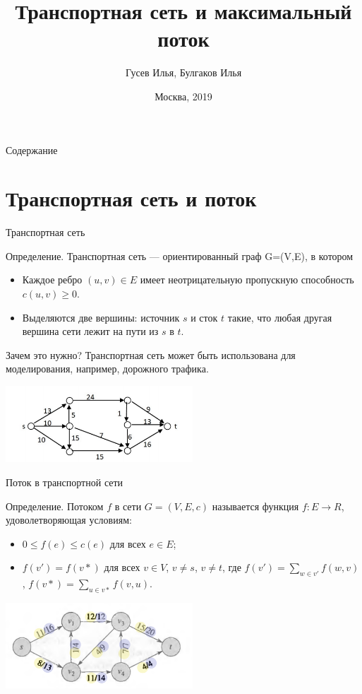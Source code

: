 \documentclass[10pt]{beamer}
\title[\href{https://goo.gl/NRgp8K}{https://goo.gl/NRgp8K} (Term 1)]{Транспортная сеть и максимальный поток}
\author[Гусев Илья, Булгаков Илья]{Гусев Илья, Булгаков Илья}
\institute[МФТИ] 
{Московский физико-технический институт\\*}
\date{Москва, 2019}
\begin{document}
\begin{frame}
  \titlepage
\end{frame}

\begin{frame}{Содержание}
\tableofcontents
\end{frame}

\section{Транспортная сеть и поток}

\begin{frame}[fragile]{Транспортная сеть}

Определение. Транспортная сеть — ориентированный граф G=(V,E), в котором
\begin{itemize}
    \item Каждое ребро $(u,v) \in E$ имеет неотрицательную пропускную способность $c(u,v)\geq 0$. 
    \item Выделяются две вершины: источник $s$ и сток $t$ такие, что любая другая вершина сети лежит на пути из $s$ в $t$.
\end{itemize}
Зачем это нужно? Транспортная сеть может быть использована для моделирования, например, дорожного трафика.

\begin{center}
    \includegraphics[width=7cm]{Term_2/Source/images/8-transport-network.jpg}
\end{center}

\end{frame}

\begin{frame}[fragile]{Поток в транспортной сети}

Определение. Потоком $f$ в сети $G=(V,E,c)$ называется функция $f:E \rightarrow R$, удоволетворяющая условиям:
\begin{itemize}
    \item $0 \leq f(e) \leq c(e)$ для всех $e \in E$;
    \item $f(v')=f(v*)$ для всех $v \in V$, $v \neq s$, $v \neq t$, где $f(v')= 
    \sum_{w \in v'} f(w,v)$, $f(v*)= \sum_{u \in v*}f(v,u)$.
\end{itemize}

\begin{center}
    \includegraphics[width=7cm]{Term_2/Source/images/8-flow-colors.png}
\end{center}

\end{frame}
\end{document}
